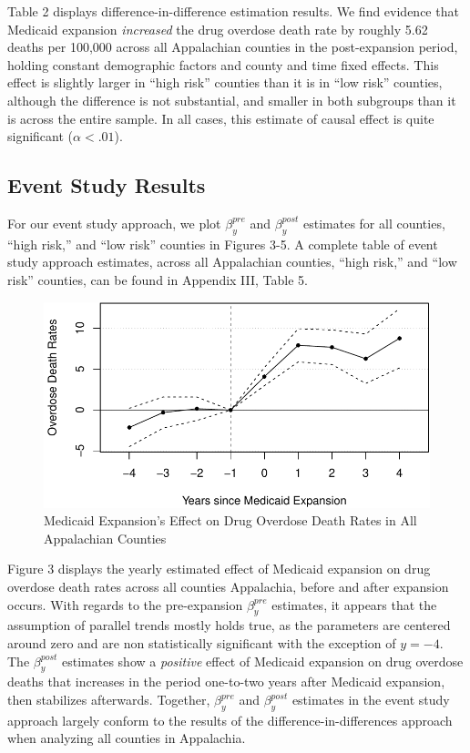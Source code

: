 \documentclass[
  11pt,
]{article}
\begin{document}
Table 2 displays difference-in-difference estimation results. We find
evidence that Medicaid expansion \emph{increased} the drug overdose
death rate by roughly 5.62 deaths per 100,000 across all Appalachian
counties in the post-expansion period, holding constant demographic
factors and county and time fixed effects. This effect is slightly
larger in ``high risk'' counties than it is in ``low risk'' counties,
although the difference is not substantial, and smaller in both
subgroups than it is across the entire sample. In all cases, this
estimate of causal effect is quite significant (\(\alpha < .01\)).

\hypertarget{event-study-results}{%
\subsection{Event Study Results}\label{event-study-results}}

For our event study approach, we plot \(\beta^{pre}_y\) and
\(\beta^{post}_y\) estimates for all counties, ``high risk,'' and ``low
risk'' counties in Figures 3-5. A complete table of event study approach
estimates, across all Appalachian counties, ``high risk,'' and ``low
risk'' counties, can be found in Appendix III, Table 5.

\begin{figure}
\centering
\includegraphics{figs/fig3.pdf}
\caption{Medicaid Expansion's Effect on Drug Overdose Death Rates in All
Appalachian Counties}
\end{figure}

Figure 3 displays the yearly estimated effect of Medicaid expansion on
drug overdose death rates across all counties Appalachia, before and
after expansion occurs. With regards to the pre-expansion
\(\beta^{pre}_y\) estimates, it appears that the assumption of parallel
trends mostly holds true, as the parameters are centered around zero and
are non statistically significant with the exception of \(y=-4\). The
\(\beta^{post}_y\) estimates show a \emph{positive} effect of Medicaid
expansion on drug overdose deaths that increases in the period
one-to-two years after Medicaid expansion, then stabilizes afterwards.
Together, \(\beta^{pre}_y\) and \(\beta^{post}_y\) estimates in the
event study approach largely conform to the results of the
difference-in-differences approach when analyzing all counties in
Appalachia.
\end{document}
